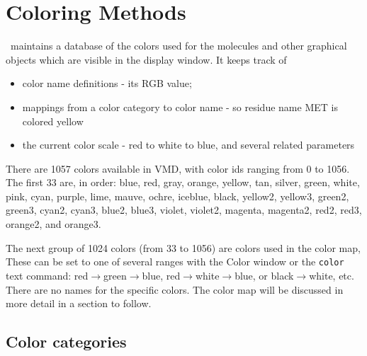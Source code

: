 %
%
%

\section{Coloring Methods}
\label{ug:topic:coloring}

\VMD\ maintains a database of the colors used for the molecules and
other graphical objects which are visible in the display window.  It
keeps track of
\begin{itemize}
  \item color name definitions - its RGB value;
  \item mappings from a color category to color name - so residue name
MET is colored yellow
  \item the current color scale - red to white to blue, and several related parameters
\end{itemize}

There are 1057 colors available in VMD, with color ids ranging from 0 to
1056.  The first 33 are,
in order: blue, red, gray, orange, yellow, tan, silver, green, white,
pink, cyan, purple, lime, mauve, ochre, iceblue, black,
yellow2, yellow3, green2, green3, cyan2, cyan3, blue2, blue3, 
violet, violet2, magenta, magenta2, red2, red3, orange2, and orange3.

The next group of 1024 colors (from 33 to 1056) are colors used in
the color map, These can be set to one of
several ranges with the {\sf Color} window or the {\tt color} text command:
red$\rightarrow$green$\rightarrow$blue,
red$\rightarrow$white$\rightarrow$blue, or black$\rightarrow$white,
etc.  There are no names for the specific colors.  The color map will
be discussed in more detail in a section to follow.


\subsection{Color categories}
\label{ug:topic:color:categories}

